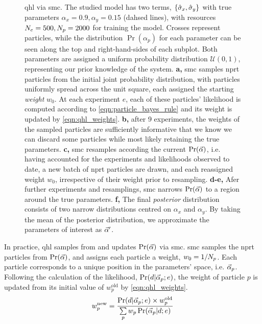 \begin{figure}
{    }
    \caption[Quantum \gls{hamiltonian} learning via sequential Monte Carlo]{
        \Acrfull{qhl} via \gls{smc}. 
        The studied model has two terms, $\{\hat{\sigma}_{x}, \hat{\sigma}_{y}\}$ with true parameters $\alpha_{x}=0.9, \alpha_y=0.15$ (dahsed lines), 
            with resources $N_e=500, N_p=2000$ for training the model. 
        Crosses represent \glspl{particle}, while the distribution $\Pr(\alpha_p)$ for each 
            parameter can be seen along the top and right-hand-sides of each subplot. 
        Both parameters are assigned a uniform probability distribution $\mathcal{U}(0,1)$, representing our prior knowledge of the system. 
        \textbf{a,} \gls{smc} samples \gls{nprt} \glspl{particle} from the initial joint probability distribution, 
            with \glspl{particle} uniformly spread across the unit square, each assigned the starting \emph{weight} $w_0$. 
            At each \gls{experiment} $e$, each of these \glspl{particle}' \gls{likelihood} is computed according to \cref{eqn:particle_bayes_rule}
            and its weight is updated by \cref{eqn:qhl_weights}.
        \textbf{b,} after 9 \glspl{experiment}, the weights of the sampled \glspl{particle} are sufficiently informative that we know we can 
            discard some \glspl{particle} while most likely retaining the true parameters. 
        \textbf{c,} \gls{smc} resamples according the current $\Pr(\vec{\alpha})$, 
            i.e. having accounted for the \glspl{experiment} and \glspl{likelihood}  observed to date, 
            a new batch of \gls{nprt} \glspl{particle} are drawn, and each reassigned weight $w_0$, 
            irrespective of their weight prior to resampling.  
        \textbf{d-e,} Afer further \glspl{experiment} and resamplings, \gls{smc} narrows $\Pr(\vec{\alpha})$ to a region around the true parameters. 
        \textbf{f,} The final \emph{posterior} distribution consists of two narrow distributions centred on $\alpha_x$ and $\alpha_y$. 
        By taking the mean of the posterior distribution, we approximate the parameters of interest as $\vec{\alpha}^{\prime}$. 
    }
    \label{fig:qhl_smc}
\end{figure}
In practice, \gls{qhl} samples from and updates $\Pr(\vec{\alpha})$  via \gls{smc}.
\gls{smc} samples the \gls{nprt} \glspl{particle} from $\Pr(\vec{\alpha})$, and assigns each \gls{particle} a weight, $w_0 = 1/N_p$.
Each \gls{particle} corresponds to a unique position in the parameters' space, i.e. $\vec{\alpha}_p$.
Following the calculation of the likelihood, $\Pr(d | \vec{\alpha}_p; e)$, 
    the weight of \gls{particle} $p$ is updated from its initial value of $w_p^{\textrm{old}}$ by \cref{eqn:qhl_weights}.
\begin{equation}\label{eqn:qhl_weights}
    w_p^{\textrm{new}} = \frac{\Pr(d | \vec{\alpha}_p; e) \times w_p^{\textrm{old}} } { \sum\limits_{p} w_p \Pr(\vec{\alpha}_p | d; e) }
\end{equation}

